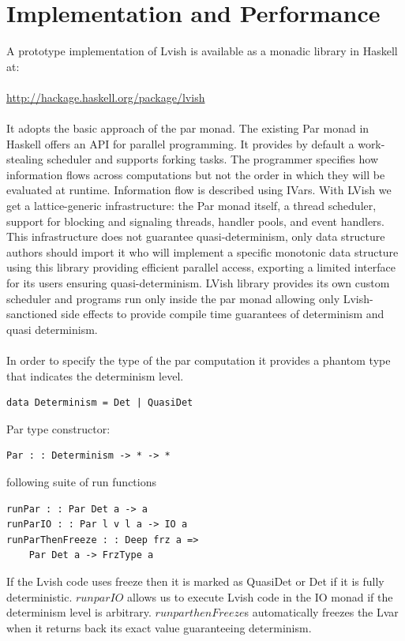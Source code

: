 \documentclass[twocolumn]{article}
\begin{document}
\section{Implementation and Performance}
A prototype implementation of Lvish is available as a monadic library in Haskell at:\\ \\
\url{http://hackage.haskell.org/package/lvish}\\ \\
It adopts the basic approach of the par monad. The existing Par monad\cite{simon} in Haskell offers an API for parallel programming. It provides by default a work-stealing scheduler and supports forking tasks. The programmer specifies how information flows across computations but not the order in which they will be evaluated at runtime. Information flow is described using IVars. With
LVish we get a lattice-generic infrastructure: the Par monad itself, a thread scheduler, support for blocking and signaling threads, handler pools, and event handlers. This infrastructure does not guarantee quasi-determinism, only data structure
authors should import it who will implement a specific monotonic data structure using this library providing efficient parallel access, exporting a limited interface for its users ensuring quasi-determinism. LVish library provides its own custom scheduler and programs run only inside the par monad allowing only Lvish-sanctioned side effects to provide compile time guarantees of
determinism and quasi determinism.\\ \\
In order to specify the type of the par computation it provides a phantom type that indicates the determinism level.
\begin{verbatim}
data Determinism = Det | QuasiDet
\end{verbatim}
Par type constructor:
\begin{verbatim}
Par : : Determinism -> * -> *
\end{verbatim}
following suite of run functions
\begin{verbatim}
runPar : : Par Det a -> a
runParIO : : Par l v l a -> IO a
runParThenFreeze : : Deep frz a =>
	Par Det a -> FrzType a
\end{verbatim}
If the Lvish code uses freeze then it is marked as QuasiDet or Det if it is fully deterministic. $runparIO$ allows us to execute Lvish code in the IO monad if the determinism level is arbitrary. $runparthenFreeze$s automatically freezes the Lvar when it returns back its exact value guaranteeing determinism.\\ \\
\end{document}
